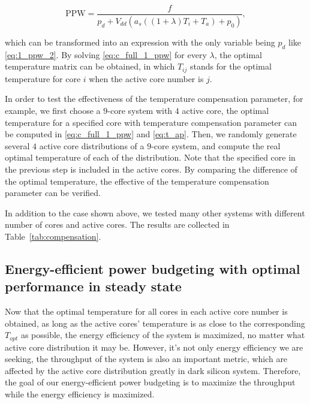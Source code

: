 \begin{equation}\label{eq:c_full_1_ppw}
\text{PPW}=\frac{f}{p_{d}+V_{dd}(a_{s}((1+\lambda)T_{i}+T_{a})+p_{0})},
\end{equation}

which can be transformed into an expression with the only variable being $p_{d}$ like \eqref{eq:1_ppw_2}. By solving \eqref{eq:c_full_1_ppw} for every $\lambda$, the optimal temperature matrix can be obtained, in which $T_{ij}$ stands for the optimal temperature for core $i$ when the active core number is $j$.

In order to test the effectiveness of the temperature compensation parameter, for example, we first choose a $9$-core system with $4$ active core, the optimal temperature for a specified core with temperature compensation parameter can be computed in \eqref{eq:c_full_1_ppw} and \eqref{eq:t_ap}. Then, we randomly generate several $4$ active core distributions of a $9$-core system, and compute the real optimal temperature of each of the distribution. Note that the specified core in the previous step is included in the active cores. By comparing the difference of the optimal temperature, the effective of the temperature compensation parameter can be verified.

In addition to the case shown above, we tested many other systems with different number of cores and active cores. The results are collected in Table~\ref{tab:compensation}.


\subsection{Energy-efficient power budgeting with optimal performance in steady state}
Now that the optimal temperature for all cores in each active core number is obtained, as long as the active cores' temperature is as close to the corresponding $T_{opt}$ as possible, the energy efficiency of the system is maximized, no matter what active core distribution it may be. However, it's not only energy efficiency we are seeking, the throughput of the system is also an important metric, which are affected by the active core distribution greatly in dark silicon system. Therefore, the goal of our energy-efficient power budgeting is to maximize the throughput while the energy efficiency is maximized.

